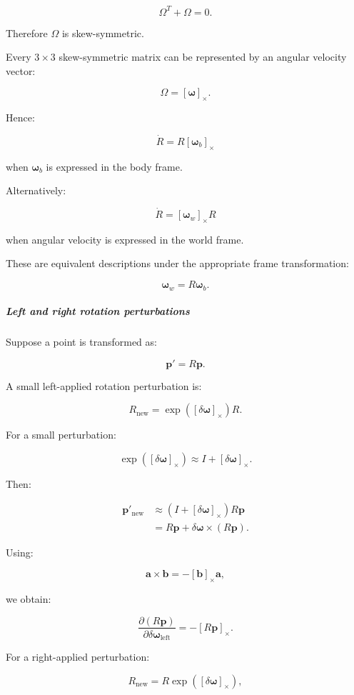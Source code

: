 \[
\Omega^T+\Omega=0.
\]

Therefore \(\Omega\) is skew-symmetric.

Every \(3\times3\) skew-symmetric matrix can be represented by an angular velocity vector:

\[
\Omega=[\boldsymbol\omega]_\times.
\]

Hence:

\[
\boxed{ \dot R=R[\boldsymbol\omega_b]_\times }
\]

when \(\boldsymbol\omega_b\) is expressed in the body frame.

Alternatively:

\[
\boxed{ \dot R=[\boldsymbol\omega_w]_\times R }
\]

when angular velocity is expressed in the world frame.

These are equivalent descriptions under the appropriate frame transformation:

\[
\boldsymbol\omega_w=R\boldsymbol\omega_b.
\]

\subparagraph{Left and right rotation perturbations}\label{left-and-right-rotation-perturbations}

Suppose a point is transformed as:

\[
\mathbf p'=R\mathbf p.
\]

A small left-applied rotation perturbation is:

\[
R_{\mathrm{new}} = \exp([\delta\boldsymbol\omega]_\times)R.
\]

For a small perturbation:

\[
\exp([\delta\boldsymbol\omega]_\times) \approx I+[\delta\boldsymbol\omega]_\times.
\]

Then:

\[
\begin{aligned} \mathbf p'_{\mathrm{new}} &\approx (I+[\delta\boldsymbol\omega]_\times)R\mathbf p\\ &=R\mathbf p+ \delta\boldsymbol\omega\times(R\mathbf p). \end{aligned}
\]

Using:

\[
\mathbf a\times\mathbf b = -[\mathbf b]_\times\mathbf a,
\]

we obtain:

\[
\boxed{ \frac{\partial(R\mathbf p)} {\partial\delta\boldsymbol\omega_{\mathrm{left}}} = -[R\mathbf p]_\times }.
\]

For a right-applied perturbation:

\[
R_{\mathrm{new}} = R\exp([\delta\boldsymbol\omega]_\times),
\]

